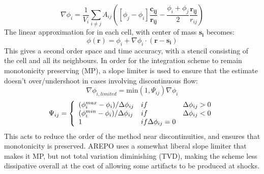 \documentclass[12pt, preprint]{aastex}
\begin{document}
\begin{equation}
	\nabla \phi_i = \frac{1}{V_i}\sum_{i\neq j}
	A_{ij}\left([\phi_j-\phi_i]\mathbf{\frac{c_{ij}}{r_{ij}}} -
\frac{\phi_i+\phi_j}{2}\frac{\mathbf{r_{ij}}}{r_{ij}}\right)
\end{equation}
The linear approximation for in each cell, with center of mass $\mathbf{s_i}$
becomes: 
\begin{equation}
	\phi(\mathbf{r}) = \phi_i + \nabla \phi_i\cdot(\mathbf{r-s_i})
\end{equation}
This gives a second order space and time accuracy, with a stencil consisting of the
cell and all its neighbours.  In order for the integration scheme
to remain monotonicity preserving (MP), a slope limiter is used to ensure that the
estimate doesn't over/undershoot in cases involving discontinuous flow:
\begin{equation}
	\nabla\phi_{i,limited} = \mathrm{min}(1,\Psi_{ij})\nabla\phi_{i}
\end{equation}
\begin{equation}
	\Psi_{ij} = \left\{
		\begin{array}{l l l}
			(\phi_i^{max}-\phi_i)/\Delta\phi_{ij} & if & \Delta\phi_{ij} > 0\\
			(\phi_i^{min}-\phi_i)/\Delta\phi_{ij} & if & \Delta\phi_{ij} < 0\\
			1 & if \Delta\phi_{ij} = 0
	\end{array} \right.
\end{equation}
This acts to reduce the order of the method near discontinuities, and ensures
that monotonicity is preserved. AREPO uses a somewhat liberal slope limiter 
that makes it MP, but not total variation diminishing (TVD), making the scheme
less dissipative overall at the cost of allowing some artifacts to be produced
at shocks.
\end{document}

